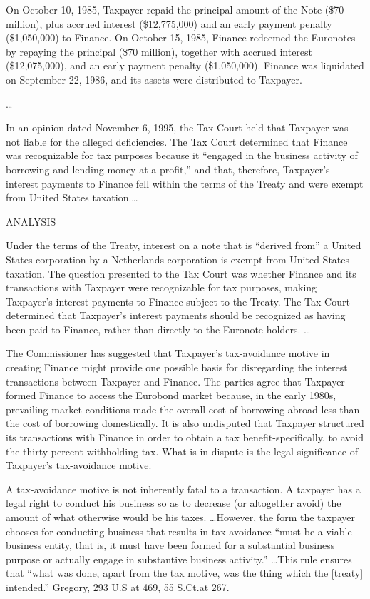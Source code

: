 \begin{select}
On October 10, 1985, Taxpayer repaid the principal amount of the Note (\$70 million), plus accrued interest (\$12,775,000) and an early payment penalty (\$1,050,000) to Finance. On October 15, 1985, Finance redeemed the Euronotes by repaying the principal (\$70 million), together with accrued interest (\$12,075,000), and an early payment penalty (\$1,050,000). Finance was liquidated on September 22, 1986, and its assets were distributed to Taxpayer.

 \ldots

In an opinion dated November 6, 1995, the Tax Court held that Taxpayer was not liable for the alleged deficiencies. The Tax Court determined that Finance was recognizable for tax purposes because it ``engaged in the business activity of borrowing and lending money at a profit,'' and that, therefore, Taxpayer's interest payments to Finance fell within the terms of the Treaty and were exempt from United States taxation.\ldots 

\begin{center} ANALYSIS
\end{center}

Under the terms of the Treaty, interest on a note that is ``derived from'' a United States corporation by a Netherlands corporation is exempt from United States taxation. The question presented to the Tax Court was whether Finance and its transactions with Taxpayer were recognizable for tax purposes, making Taxpayer's interest payments to Finance subject to the Treaty. The Tax Court determined that Taxpayer's interest payments should be recognized as having been paid to Finance, rather than directly to the Euronote holders.  \ldots

The Commissioner has suggested that Taxpayer's tax-avoidance motive in creating Finance might provide one possible basis for disregarding the interest transactions between Taxpayer and Finance. The parties agree that Taxpayer formed Finance to access the Eurobond market because, in the early 1980s, prevailing market conditions made the overall cost of borrowing abroad less than the cost of borrowing domestically. It is also undisputed that Taxpayer structured its transactions with Finance in order to obtain a tax benefit-specifically, to avoid the thirty-percent withholding tax. What is in dispute is the legal significance of Taxpayer's tax-avoidance motive.

A tax-avoidance motive is not inherently fatal to a transaction. A taxpayer has a legal right to conduct his business so as to decrease (or altogether avoid) the amount of what otherwise would be his taxes.  \ldots However, the form the taxpayer chooses for conducting business that results in tax-avoidance ``must be a viable business entity, that is, it must have been formed for a substantial business purpose or actually engage in substantive business activity.'' \ldots This rule ensures that ``what was done, apart from the tax motive, was the thing which the [treaty] intended.'' Gregory, 293 U.S at 469, 55 S.Ct.\@ at 267.


\end{select}
